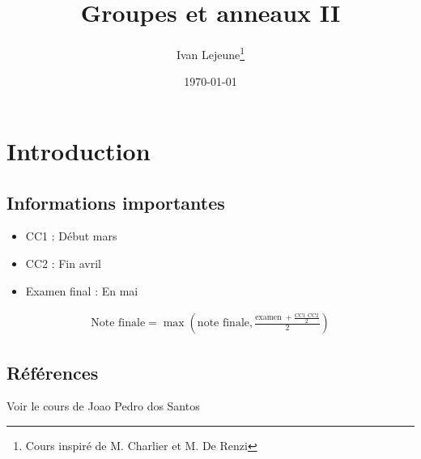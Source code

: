 \documentclass[french,a4paper,10pt]{article}
\title{\color{astral} \sffamily \bfseries Groupes et anneaux II}
\author{Ivan Lejeune\thanks{Cours inspiré de M. Charlier et M. De Renzi}}
\date{\today}
\begin{document}
	\maketitle
	\section{Introduction}
	\subsection{Informations importantes}
	\begin{itemize}[$-$]
		\item CC1 : Début mars
		\item CC2 : Fin avril
		\item Examen final : En mai
	\end{itemize}
	
	\[\begin{aligned}
		\text{Note finale} = \max\left(\text{note finale}, \frac{\text{examen } + \frac{\text{CC1 }\text{CC2}}2}2\right)
	\end{aligned}\]
	
	\subsection{Références}
	
	Voir le cours de Joao Pedro dos Santos
	
\end{document}
